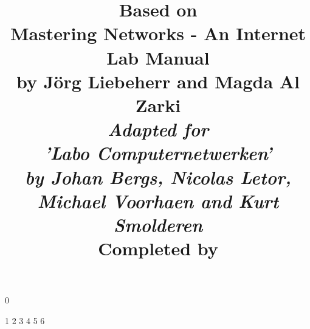 

\title{
\textbf{Based on \\ Mastering Networks - An Internet Lab Manual\\
by J\"{o}rg Liebeherr and Magda Al Zarki}\\
\vspace{10mm}
\large{\emph{Adapted for \\ 'Labo Computernetwerken' \\
by Johan Bergs, Nicolas Letor, Michael Voorhaen and Kurt Smolderen}} \\
\vspace{10mm}
\large{Completed by}
\vspace{-10mm}
}




\frontmatter
\maketitle

\mainmatter
%
\setcounter {chapter} {0}

\setcounter {chapter} {1}
%
\setcounter {chapter} {2}
%
\setcounter {chapter} {3}
%
\setcounter {chapter} {4}
%
\setcounter {chapter} {5}
%
\setcounter {chapter} {6}
%
\backmatter


 
